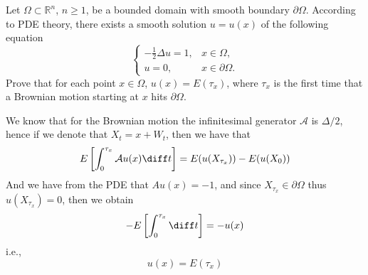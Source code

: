 \problem
\begin{question}
    Let $\Omega \subset\mathbb R^n$, $n\geq1$, be a bounded domain with smooth boundary $\partial\Omega$.  According to PDE theory, there exists a smooth solution $u=u(x)$ of the following equation
    \begin{equation}
    \left\{
    \begin{array}{ll}
    -\frac{1}{2}\Delta u=1,&x\in\Omega,\\
    u=0,&x\in\partial \Omega.
    \end{array}
    \right.
    \end{equation}
    Prove that for each point $x\in\Omega$, $u(x)=E(\tau_x)$, where $\tau_x$ is the first time that a Brownian motion starting at $x$ hits $\partial \Omega$.
\end{question}
We know that for the Brownian motion the infinitesimal generator
$\mathcal A$ is $\Delta/2$, hence if we denote that $X_t=x+W_t$, then
we have that
\[E\left[\int_0^{\tau_x}\mathcal Au(x)\diff t\right]
=E(u(X_{\tau_x}))-E(u(X_0))\]
And we have from the PDE that $Au(x)=-1$,
and since $X_{\tau_x}\in\partial\Omega$ thus $u(X_{\tau_x})=0$,
then we obtain
\[-E\left[\int_0^{\tau_x}\diff t\right]=-u(x)\]
i.e.,
\[u(x)=E(\tau_x)\]


